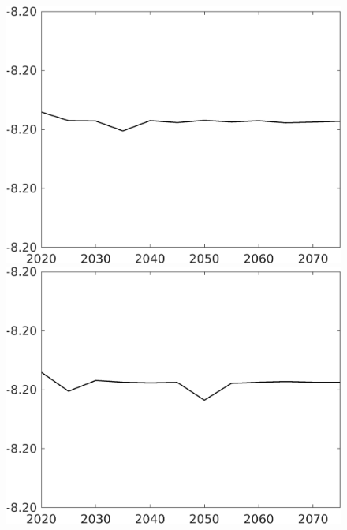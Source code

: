 \documentclass[12pt]{article}
\begin{document}
\begin{figure}[h!!]
\begin{minipage}[]{0.32\textwidth}
	\end{minipage}	
\begin{minipage}[]{0.32\textwidth}
\includegraphics[width=1\textwidth]{../../codding_model/own_basedOnFried/optimalPol_010922_revision/figures/all_13Sept22/CompTaul_LFBAUPer_Reg0_Lf_spillover0_nsk1_xgr1_knspil1_sep1_countec0_GovRev0_etaa0.79.png}
\end{minipage}	
\begin{minipage}[]{0.32\textwidth}
\includegraphics[width=1\textwidth]{../../codding_model/own_basedOnFried/optimalPol_010922_revision/figures/all_13Sept22/CompTaul_LFBAUPer_Reg0_Lg_spillover0_nsk1_xgr1_knspil1_sep1_countec0_GovRev0_etaa0.79.png}

\end{minipage}
\end{figure}
\end{document}
